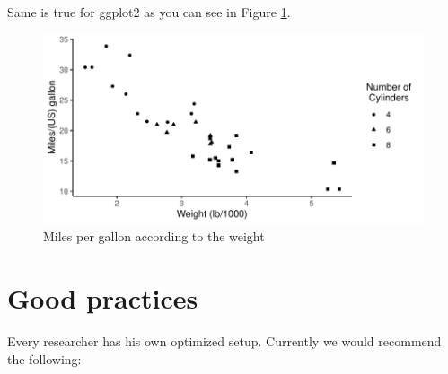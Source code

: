 \documentclass[
  12pt,
]{article}
\newenvironment{Shaded}{\begin{snugshade}}{\end{snugshade}}
\newcommand{\AttributeTok}[1]{\textcolor[rgb]{0.77,0.63,0.00}{#1}}
\newcommand{\CommentTok}[1]{\textcolor[rgb]{0.56,0.35,0.01}{\textit{#1}}}
\newcommand{\FunctionTok}[1]{\textcolor[rgb]{0.00,0.00,0.00}{#1}}
\newcommand{\NormalTok}[1]{#1}
\newcommand{\OtherTok}[1]{\textcolor[rgb]{0.56,0.35,0.01}{#1}}
\newcommand{\SpecialCharTok}[1]{\textcolor[rgb]{0.00,0.00,0.00}{#1}}
\newcommand{\StringTok}[1]{\textcolor[rgb]{0.31,0.60,0.02}{#1}}
\begin{document}
Same is true for ggplot2 as you can see in Figure \ref{fig:fig-2}.

\begin{Shaded}
\end{Shaded}

\begin{figure}[H]

{\centering \includegraphics{paper_files/figure-latex/fig-2-1} 

}

\caption{Miles per gallon according to the weight}\label{fig:fig-2}
\end{figure}

\hypertarget{good-practices}{%
\section{Good practices}\label{good-practices}}

Every researcher has his own optimized setup. Currently we would recommend the following:
\end{document}
